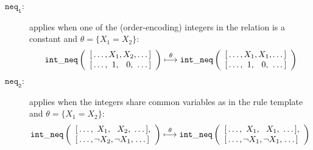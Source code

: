 \documentclass{tlp}
\begin{document}
\begin{description}
\item[$\mathtt{neq_1}:$] applies when one of the (order-encoding)
  integers in the relation is a constant and $\theta=\{X_1=X_2\}$:
\[
\mathtt{int\_neq}\left( 
\begin{array}{cccc}
{[}\ldots,\hspace{-3mm}&X_1,\hspace{-3mm}&X_2,\hspace{-3mm}& \ldots{]} \\
{[}\ldots,\hspace{-3mm}&1,  \hspace{-3mm}& 0,\hspace{-3mm}&  \ldots{]}
\end{array}
\right)
\overset{\theta}{\longmapsto}
\mathtt{int\_neq}\left(
\begin{array}{cccc}
{[}\ldots,\hspace{-3mm}&X_1,\hspace{-3mm}&X_1,\hspace{-3mm}& \ldots{]} \\
{[}\ldots,\hspace{-3mm}&1,  \hspace{-3mm}& 0,\hspace{-3mm}&  \ldots{]}
\end{array}
\right)
\]


\item[$\mathtt{neq_2}:$] applies when the integers share common
  variables as in the rule template and $\theta=\{X_1=X_2\}$:
\[
\mathtt{int\_neq}\left( 
\begin{array}{cccc}
{[}\ldots,\hspace{-3mm}&X_1,\hspace{-3mm}&X_2,\hspace{-3mm}&\ldots{]}, \\
{[}\ldots,\hspace{-3mm}&\neg X_2,\hspace{-3mm}&\neg X_1,\hspace{-3mm}&\ldots{]}
\end{array}
\right)
\overset{\theta}{\longmapsto}
\mathtt{int\_neq}\left(
\begin{array}{cccc}
{[}\ldots,\hspace{-3mm}&X_1,\hspace{-3mm}&X_1,\hspace{-3mm}&\ldots{]}, \\
{[}\ldots,\hspace{-3mm}&\neg X_1,\hspace{-3mm}&\neg X_1,\hspace{-3mm}&\ldots{]}
\end{array}
\right)
\]
\end{description}
\end{document}
